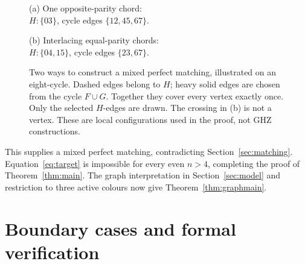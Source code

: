 \documentclass[11pt]{article}
\theoremstyle{definition}
\theoremstyle{plain}
\numberwithin{equation}{section}
\begin{document}
\begin{figure}[htbp]
\centering
\begin{minipage}[t]{0.48\textwidth}
\centering
{}

\small (a) One opposite-parity chord:\\
\(H:\{03\}\), cycle edges \(\{12,45,67\}\).
\end{minipage}\hfill
\begin{minipage}[t]{0.48\textwidth}
\centering
{}

\small (b) Interlacing equal-parity chords:\\
\(H:\{04,15\}\), cycle edges \(\{23,67\}\).
\end{minipage}
\caption{Two ways to construct a mixed perfect matching, illustrated on
an eight-cycle. Dashed edges belong to \(H\); heavy solid edges are chosen
from the cycle \(F\cup G\). Together they cover every vertex exactly once.
Only the selected \(H\)-edges are drawn. The crossing in (b) is not a vertex.
These are local configurations used in the proof, not GHZ constructions.}
\label{fig:chords}
\end{figure}

This supplies a mixed perfect matching, contradicting Section~\ref{sec:matching}.
Equation~\eqref{eq:target} is impossible for every even \(n>4\), completing
the proof of Theorem~\ref{thm:main}. The graph interpretation in
Section~\ref{sec:model} and restriction to three active colours now give
Theorem~\ref{thm:graphmain}.

\section{Boundary cases and formal verification}\label{sec:scope}
\end{document}
